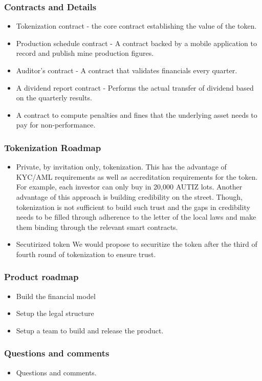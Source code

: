\documentclass{beamer}
\begin{document}
\begin{frame}
  \frametitle {Contracts and Details}
  \begin{minipage}{\textwidth}
    \begin{itemize}
    \item  Tokenization contract - the core contract establishing the value of the token.
    \item  Production schedule contract - A contract backed by a mobile application to record and publish mine production figures.
    \item  Auditor's contract - A contract that validates financials every quarter.
    \item  A dividend report contract - Performs the actual transfer of dividend based on the quarterly results.
    \item  A contract to compute penalties and fines that the underlying asset needs to pay for non-performance.
    \end{itemize}
  \end{minipage}
\end{frame}

\begin{frame}
  \frametitle {Tokenization Roadmap}
  \begin{minipage}{\textwidth}
    \begin{itemize}
    \item  Private, by invitation only, tokenization. This has the advantage of KYC/AML requirements as well as accreditation requirements for the token.
    For example, each investor can only buy in 20,000 AUTIZ lots. Another advantage of this approach is building credibility on the street. Though, tokenization is not sufficient to build such trust and the gaps in credibility needs to be filled through adherence to the letter of the local laws and make them binding through the relevant smart contracts.
    \item  Secutirized token
      We would propose to securitize the token after the third of fourth round of tokenization to ensure trust.
    \end{itemize}
  \end{minipage}
\end{frame}

\begin{frame}
  \frametitle {Product roadmap}
  \begin{minipage}{\textwidth}
    \begin{itemize}
      \item  Build the financial model
      \item  Setup the legal structure
      \item  Setup a team to build and release the product.
    \end{itemize}
  \end{minipage}
\end{frame}

\begin{frame}
  \frametitle {Questions and comments}
  \begin{minipage}{\textwidth}
    \begin{itemize}
      \item  Questions and comments.
    \end{itemize}
  \end{minipage}
\end{frame}
\end{document}
